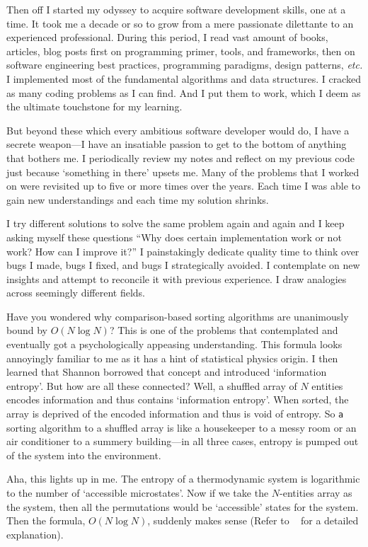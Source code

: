 Then off I started my odyssey to acquire software development skills, one at a time.
It took me a decade or so to grow from a mere passionate dilettante to an experienced professional.
During this period, I read vast amount of books, articles, blog posts first on programming
primer, tools, and frameworks, then on software engineering best practices, programming paradigms,
design patterns, \textit{etc.}
I implemented most of the fundamental algorithms and data structures.
I cracked as many coding problems as I can find.
And I put them to work, which I deem as the ultimate touchstone for my learning.


But beyond these which every ambitious software developer would do,
I have a secrete weapon---I have an insatiable passion to get to the bottom
of anything that bothers me.
I periodically review my notes and reflect on my previous code just because
`something in there' upsets me.
Many of the problems that I worked on were revisited up to five or more times over the years.
Each time I was able to gain new understandings and each time my solution shrinks.


I try different solutions to solve the same problem again and again and
I keep asking myself these questions ``Why does certain implementation work or not work?
How can I improve it?''
I painstakingly dedicate quality time to think over bugs I made, bugs I fixed,
and bugs I strategically avoided.
I contemplate on new insights and attempt to reconcile it with previous experience.
I draw analogies across seemingly different fields.


Have you wondered why comparison-based sorting algorithms are unanimously bound by $O(N \log N)$?
This is one of the problems that contemplated and eventually got a psychologically
appeasing understanding.
This formula looks annoyingly familiar to me as it has a hint of statistical physics origin.
I then learned that Shannon borrowed that concept and introduced `information
entropy'\cite{Shannon-mathematical-1948}.
But how are all these connected?
Well, a shuffled array of $N$ entities encodes information and thus contains `information entropy'.
When sorted, the array is deprived of the encoded information and thus is void of entropy.
So \texttt{a} sorting algorithm to a shuffled array is like a
housekeeper to a messy room or an air conditioner to a summery building---in all three cases,
entropy is pumped out of the system into the environment.


Aha, this lights up in me.
The entropy of a thermodynamic system is logarithmic to the number of `accessible microstates'.
Now if we take the $N$-entities array as the system, then all the permutations would be
`accessible' states for the system.
Then the formula, $O(N \log N)$, suddenly makes sense
(Refer to ~ for a detailed explanation).



